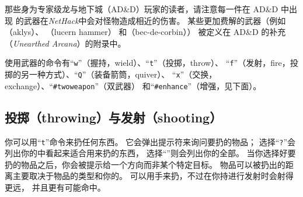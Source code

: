 \documentclass[a4paper, 10pt]{article}
\begin{document}
那些身为专家级龙与地下城（AD\&D）玩家的读者，请注意每一件在 AD\&D 中出现
的武器在{\it NetHack}中会对怪物造成相近的伤害。
某些更加费解的武器（例如{\it\zhTransAklys}（aklys）、
{\it\zhTransLucernHammer}（lucern hammer）
和{\it\zhTransBecDeCorbin}（bec-de-corbin））
被定义在 AD\&D 的补充\zhTransUnearthedArcana（{\it Unearthed Arcana}）的附录中。

使用武器的命令有“{\tt w}”（握持，wield）、“{\tt t}”（投掷，throw）、
“{\tt f}”（发射，fire，投掷的另一种方式）、“{\tt Q}”（装备箭筒，quiver）、
“{\tt x}”（交换，exchange）、“{\tt \#twoweapon}”（双武器）
和“{\tt \#enhance}”（增强，见下面）。

\subsection*{投掷（throwing）与发射（shooting）}

你可以用“{\tt t}”命令来扔任何东西。
它会弹出提示符来询问要扔的物品；
选择“{\tt ?}”会列出你的\zhTransInventory{}中看起来适合用来扔的东西，
选择“{\tt *}”则会列出你的全部\zhTransInventory。
当你选择好要扔的物品之后，你会被提示给一个方向而非某个特定目标。
物品可以被扔出的距离主要取决于物品的类型和你的\zhTransStrength。
\zhTransArrows{}可以用手来扔，不过在你持\zhTransBow{}进行发射时会射得更远，
并且更有可能命中。
\end{document}
